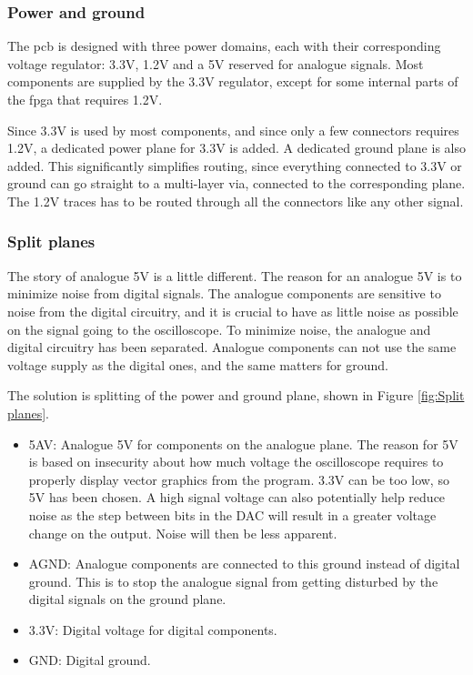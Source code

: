 \subsubsection{Power and ground}
\label{Power}
The \gls{pcb} is designed with three power domains, each with their corresponding voltage regulator: 3.3V, 1.2V and a 5V reserved for analogue signals.
Most components are supplied by the 3.3V regulator, except for some internal parts of the \gls{fpga} that requires 1.2V.

Since 3.3V is used by most components, and since only a few connectors requires 1.2V, a dedicated power plane for 3.3V is added.
A dedicated ground plane is also added.
This significantly simplifies routing, since everything connected to 3.3V or ground can go straight to a multi-layer via, connected to the corresponding plane.
The 1.2V traces has to be routed through all the connectors like any other signal.

\subsubsection{Split planes}
The story of analogue 5V is a little different.
The reason for an analogue 5V is to minimize noise from digital signals.
The analogue components are sensitive to noise from the digital circuitry, and it is crucial to have as little noise as possible on the signal going to the oscilloscope.
To minimize noise, the analogue and digital circuitry has been separated.
Analogue components can not use the same voltage supply as the digital ones, and the same matters for ground.

The solution is splitting of the power and ground plane, shown in Figure \ref{fig:Split planes}.
\begin{itemize}
\item 5AV: Analogue 5V for components on the analogue plane.
The reason for 5V is based on insecurity about how much voltage the oscilloscope requires to properly display vector graphics from the program.
3.3V can be too low, so 5V has been chosen.
A high signal voltage can also potentially help reduce noise as the step between bits in the DAC will result in a greater voltage change on the output.
Noise will then be less apparent.
\item AGND: Analogue components are connected to this ground instead of digital ground.
This is to stop the analogue signal from getting disturbed by the digital signals on the ground plane.
\item 3.3V: Digital voltage for digital components.
\item GND: Digital ground.
\end{itemize}

